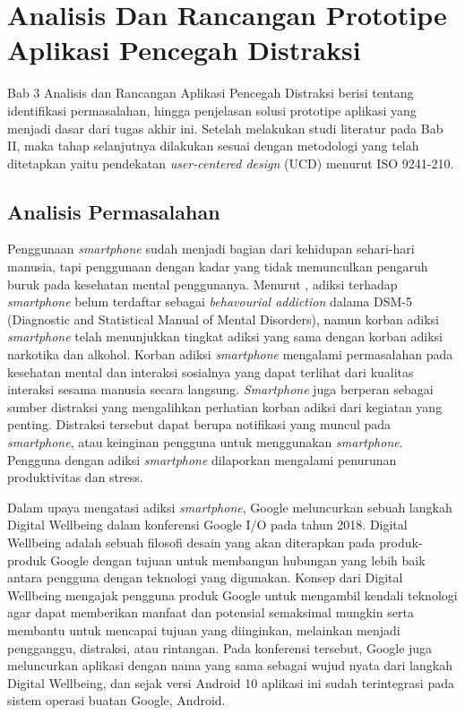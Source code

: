 \chapter{Analisis Dan Rancangan Prototipe Aplikasi Pencegah Distraksi}

Bab 3 Analisis dan Rancangan Aplikasi Pencegah Distraksi berisi tentang identifikasi permasalahan, hingga penjelasan solusi prototipe aplikasi yang menjadi dasar dari tugas akhir ini. Setelah melakukan studi literatur pada Bab II, maka tahap selanjutnya dilakukan sesuai dengan metodologi yang telah ditetapkan yaitu pendekatan \textit{user-centered design} (UCD) menurut ISO 9241-210.

\section{Analisis Permasalahan}
\label{sec:analisis_masalah}

Penggunaan \textit{smartphone} sudah menjadi bagian dari kehidupan sehari-hari manusia, tapi penggunaan dengan kadar yang tidak memunculkan pengaruh buruk pada kesehatan mental penggunanya. Menurut \textcite{10.1371/journal.pone.0083558}, adiksi terhadap \textit{smartphone} belum terdaftar sebagai \textit{behavourial addiction} dalama DSM-5 (Diagnostic and Statistical Manual of Mental Disorders), namun korban adiksi \textit{smartphone} telah menunjukkan tingkat adiksi yang sama dengan korban adiksi narkotika dan alkohol. Korban adiksi \textit{smartphone} mengalami permasalahan pada kesehatan mental dan interaksi sosialnya yang dapat terlihat dari kualitas interaksi sesama manusia secara langsung. \parencite{Roffarello2019} \textit{Smartphone} juga berperan sebagai sumber distraksi yang mengalihkan perhatian korban adiksi dari kegiatan yang penting. Distraksi tersebut dapat berupa notifikasi yang muncul pada \textit{smartphone}, atau keinginan pengguna untuk menggunakan \textit{smartphone}. Pengguna dengan adiksi \textit{smartphone} dilaporkan mengalami penurunan produktivitas dan stress.


Dalam upaya mengatasi adiksi \textit{smartphone}, Google meluncurkan sebuah langkah Digital Wellbeing dalam konferensi Google I/O pada tahun 2018. Digital Wellbeing adalah sebuah filosofi desain yang akan diterapkan pada produk-produk Google dengan tujuan untuk membangun hubungan yang lebih baik antara pengguna dengan teknologi yang digunakan. Konsep dari Digital Wellbeing mengajak pengguna produk Google untuk mengambil kendali teknologi agar dapat memberikan manfaat dan potensial semaksimal mungkin serta membantu untuk mencapai tujuan yang diinginkan, melainkan menjadi pengganggu, distraksi, atau rintangan. \parencite{google2019dwcourse} Pada konferensi tersebut, Google juga meluncurkan aplikasi dengan nama yang sama sebagai wujud nyata dari langkah Digital Wellbeing, dan sejak versi Android 10 aplikasi ini sudah terintegrasi pada sistem operasi buatan Google, Android.


